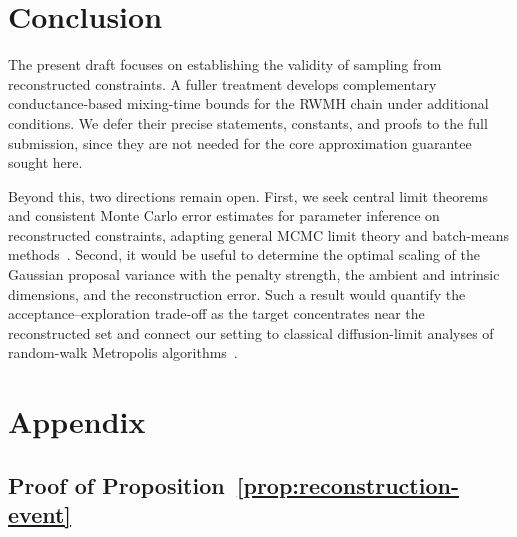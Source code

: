 \documentclass{article}
\numberwithin{equation}{section}
\begin{document}
\section{Conclusion}

The present draft focuses on establishing the validity of sampling from
reconstructed constraints. A fuller treatment develops complementary
conductance-based mixing-time bounds for the RWMH chain under additional
conditions. We defer their precise statements, constants, and proofs to the
full submission, since they are not needed for the core approximation
guarantee sought here.

Beyond this, two directions remain open. First, we seek central limit
theorems and consistent Monte Carlo error estimates for parameter inference
on reconstructed constraints, adapting general MCMC limit theory and
batch-means methods~\citep{roberts1996geometric,flegal2010batch}. Second, it
would be useful to determine the optimal scaling of the Gaussian proposal
variance with the penalty strength, the ambient and intrinsic dimensions,
and the reconstruction error. Such a result would quantify the
acceptance--exploration trade-off as the target concentrates near the
reconstructed set and connect our setting to classical diffusion-limit
analyses of random-walk Metropolis algorithms~\citep{roberts1997weak,roberts2001optimal}.



\appendix

\section{Appendix}

\label{sec:proofs}



\subsection{Proof of Proposition~\ref{prop:reconstruction-event}}

\label{sec:reconstruction-proof}
\end{document}
